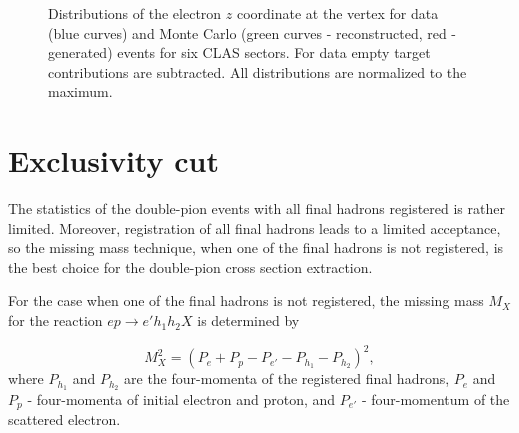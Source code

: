 \begin{figure}[htp]
\begin{center}
\caption{\small Distributions of the electron $z$ coordinate at the vertex for data (blue curves) and Monte Carlo (green curves - reconstructed, red - generated)  events for six CLAS sectors. For data empty target contributions are subtracted. All distributions are normalized to the maximum. \label{fig:vertex_cut_sim}}
\end{center}
\end{figure}




\section{Exclusivity cut}
\label{excl_cut}

The statistics of the double-pion events with all final hadrons registered is rather limited. Moreover, registration of all final hadrons leads to a limited acceptance, so the missing mass technique, when one of the final hadrons is  not registered, is the best choice for the double-pion cross section extraction.

For the case when one of the final hadrons is not registered, the missing mass $M_{X}$ for the reaction $e p \rightarrow e' h_1 h_2 X$ is determined by 



\begin{equation}
M_{X}^{2} = (P_{e} + P_{p} -P_{e'} - P_{h_1} - P_{h_2})^{2},
\label{eg:miss_mass}
\end{equation} 
where $P_{h_1}$ and $P_{h_2}$ are the four-momenta of the registered final hadrons, $P_{e}$ and $P_{p}$ - four-momenta of initial electron and proton, and $P_{e'}$ - four-momentum of the scattered electron.

